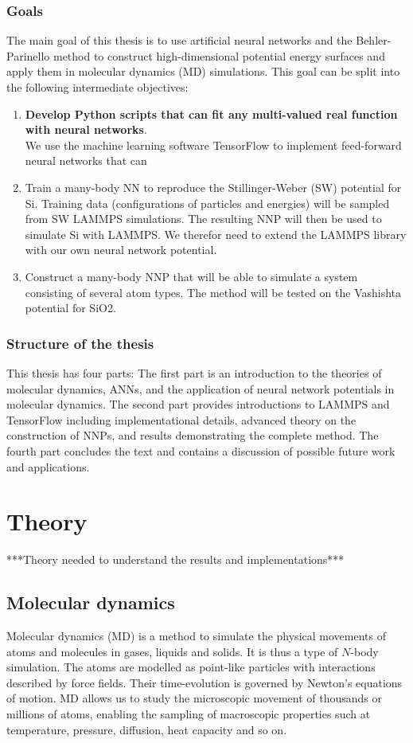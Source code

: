 \documentclass[twoside,english]{uiofysmaster}
\begin{document}
\section{Goals}
The main goal of this thesis is to use artificial neural networks and the Behler-Parinello method to
construct high-dimensional potential energy surfaces and apply them in molecular dynamics (MD) simulations.
This goal can be split into the following intermediate objectives:
\begin{enumerate}[label=\textbf{\alph*)}]
 \item \textbf{Develop Python scripts that can fit any multi-valued real function with neural networks}. \\
 \indent We use the machine learning software TensorFlow to implement feed-forward neural networks that can 
 \item Train a many-body NN to reproduce the Stillinger-Weber (SW) potential for Si. 
 Training data (configurations of particles and energies) will be sampled from SW LAMMPS simulations. 
 The resulting NNP will then be used to simulate Si with LAMMPS. 
 We therefor need to extend the LAMMPS library with our own neural network potential.
 \item Construct a many-body NNP that will be able to simulate a system consisting of several atom types. 
 The method will be tested on the Vashishta potential for SiO2.
\end{enumerate}

\section{Structure of the thesis}
This thesis has four parts: The first part is an introduction to the theories of 
molecular dynamics, ANNs, and the application of neural network potentials in molecular dynamics. 
The second part provides introductions to LAMMPS and TensorFlow including implementational details, 
advanced theory on the construction of NNPs, and results demonstrating the complete method. 
The fourth part concludes the text and contains a discussion of possible future work and applications. 




\part{Theory}
***Theory needed to understand the results and implementations***

\chapter{Molecular dynamics}
Molecular dynamics (MD) is a method to simulate the physical movements of atoms and molecules in gases, liquids and solids. 
It is thus a type of $N$-body simulation. The atoms are modelled as point-like particles with interactions described
by force fields. Their time-evolution is governed by Newton's equations of motion. MD allows us to study the microscopic
movement of thousands or millions of atoms, enabling the sampling of macroscopic properties such at temperature, pressure, 
diffusion, heat capacity and so on. 
\end{document}
